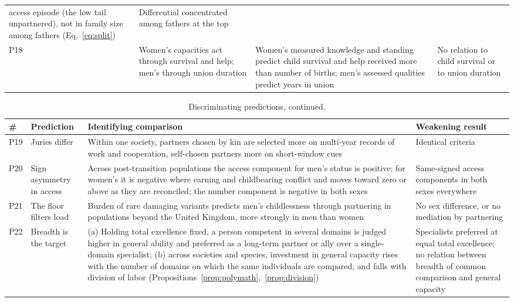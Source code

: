 \begin{table}[tp]
\begin{tabularx}{\textwidth}{@{}P{0.028\textwidth}P{0.19\textwidth}LP{0.25\textwidth}@{}}
access episode (the low tail unpartnered), not in family size among fathers (Eq.~\ref{eq:split}) & Differential concentrated
among fathers at the top\\
P18 & Women's capacities act through survival and help; men's through union duration & Women's measured knowledge and standing
predict child survival and help received more than number of births; men's assessed qualities predict years in union & No
relation to child survival or to union duration\\
\bottomrule
\end{tabularx}
\end{table}

\begin{table}[tp]
\caption{Discriminating predictions, continued.}\label{tab:predictionsb}
\scriptsize
\begin{tabularx}{\textwidth}{@{}P{0.028\textwidth}P{0.19\textwidth}LP{0.25\textwidth}@{}}
\toprule
\# & Prediction & Identifying comparison & Weakening result\\
\midrule
P19 & Juries differ & Within one society, partners chosen by kin are selected more on multi-year records of work and
cooperation, self-chosen partners more on short-window cues & Identical criteria\\
P20 & Sign asymmetry in access & Across post-transition populations the access component for men's status is positive; for
women's it is negative where earning and childbearing conflict and moves toward zero or above as they are reconciled; the
number component is negative in both sexes & Same-signed access components in both sexes everywhere\\
P21 & The floor filters load & Burden of rare damaging variants predicts men's childlessness through partnering in
populations beyond the United Kingdom, more strongly in men than women & No sex difference, or no mediation by partnering\\
P22 & Breadth is the target & (a) Holding total excellence fixed, a person competent in several domains is judged higher in
general ability and preferred as a long-term partner or ally over a single-domain specialist; (b) across societies and
species, investment in general capacity rises with the number of domains on which the same individuals are compared, and
falls with division of labor (Propositions~\ref{prop:polymath},~\ref{prop:division}) & Specialists preferred at equal total
excellence; no relation between breadth of common comparison and general capacity\\

\end{tabularx}
\end{table}
